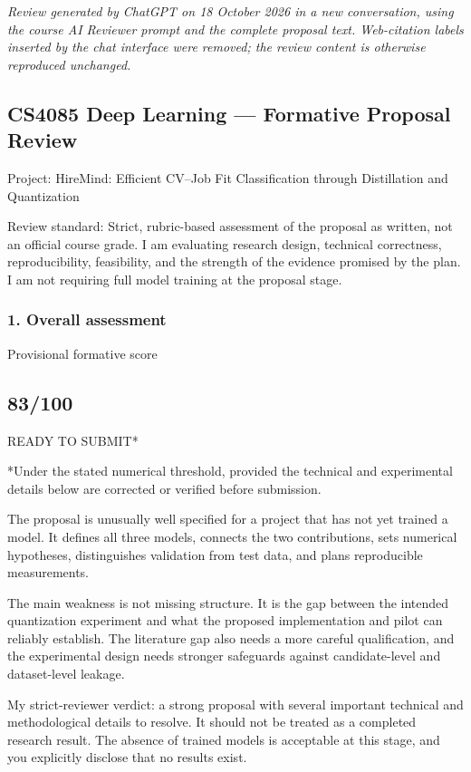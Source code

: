 \noindent\textit{Review generated by ChatGPT on 18 October 2026 in a new conversation, using the course AI Reviewer prompt and the complete proposal text. Web-citation labels inserted by the chat interface were removed; the review content is otherwise reproduced unchanged.}

\subsection*{CS4085 Deep Learning — Formative Proposal Review}
Project: HireMind: Efficient CV–Job Fit Classification through Distillation and Quantization

Review standard: Strict, rubric-based assessment of the proposal as written, not an official course grade. I am evaluating research design, technical correctness, reproducibility, feasibility, and the strength of the evidence promised by the plan. I am not requiring full model training at the proposal stage.

\subsubsection*{1. Overall assessment}
Provisional formative score

\subsection*{83/100}
READY TO SUBMIT*

*Under the stated numerical threshold, provided the technical and experimental details below are corrected or verified before submission.

The proposal is unusually well specified for a project that has not yet trained a model. It defines all three models, connects the two contributions, sets numerical hypotheses, distinguishes validation from test data, and plans reproducible measurements.

The main weakness is not missing structure. It is the gap between the intended quantization experiment and what the proposed implementation and pilot can reliably establish. The literature gap also needs a more careful qualification, and the experimental design needs stronger safeguards against candidate-level and dataset-level leakage.

My strict-reviewer verdict: a strong proposal with several important technical and methodological details to resolve. It should not be treated as a completed research result. The absence of trained models is acceptable at this stage, and you explicitly disclose that no results exist.

